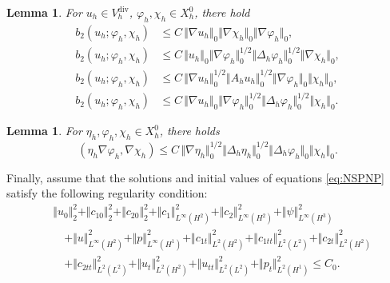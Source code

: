 \documentclass[a4paper,fleqn]{cas-sc}
\numberwithin{equation}{section}
\newtheorem{lemma}[theorem]{Lemma}
\theoremstyle{definition}
\begin{document}
\begin{lemma}
  \label{lem:3}
  For $u_{h}\in V_{h}^{\mathrm{div}}$, $\varphi_{h},\chi_{h}\in X^{0}_{h}$,
  there hold
  \begin{align}
    b_{2}(u_{h};\varphi_{h},\chi_{h})
    &\le C\,\Vert\nabla u_{h}\Vert_{0}
            \Vert\nabla\chi_{h}\Vert_{0}
            \Vert\nabla\varphi_{h}\Vert_{0},
    \label{eq:2.32}\\
    b_{2}(u_{h};\varphi_{h},\chi_{h})
    &\le C\,\Vert u_{h}\Vert_{0}
            \Vert\nabla\varphi_{h}\Vert_{0}^{1/2}
            \Vert\Delta_{h}\varphi_{h}\Vert_{0}^{1/2}
            \Vert\nabla\chi_{h}\Vert_{0},
    \label{eq:2.33}\\
    b_{2}(u_{h};\varphi_{h},\chi_{h})
    &\le C\,\Vert\nabla u_{h}\Vert_{0}^{1/2}
            \Vert A_{h}u_{h}\Vert_{0}^{1/2}
            \Vert\nabla\varphi_{h}\Vert_{0}
            \Vert\chi_{h}\Vert_{0},
    \label{eq:2.34}\\
    b_{2}(u_{h};\varphi_{h},\chi_{h})
    &\le C\,\Vert\nabla u_{h}\Vert_{0}
            \Vert\nabla\varphi_{h}\Vert_{0}^{1/2}
            \Vert\Delta_{h}\varphi_{h}\Vert_{0}^{1/2}
            \Vert\chi_{h}\Vert_{0}.
    \label{eq:2.35}
  \end{align}
\end{lemma}

\begin{lemma}
  \label{lem:4}
  For $\eta_{h},\varphi_{h},\chi_{h}\in X^{0}_{h}$, there holds
  \begin{equation}
    (\eta_{h}\nabla\varphi_{h},\nabla\chi_{h})
    \le C\,\Vert\nabla\eta_{h}\Vert_{0}^{1/2}
           \Vert\Delta_{h}\eta_{h}\Vert_{0}^{1/2}
           \Vert\Delta_{h}\varphi_{h}\Vert_{0}
           \Vert\chi_{h}\Vert_{0}.
    \label{eq:2.36}
  \end{equation}
\end{lemma}

Finally, assume that the solutions and initial values of equations
\eqref{eq:NSPNP} satisfy the following regularity condition:
\begin{equation}
  \begin{aligned}
    &\Vert u_{0}\Vert_{2}^{2}
     + \Vert c_{10}\Vert_{2}^{2}
     + \Vert c_{20}\Vert_{2}^{2}
     + \Vert c_{1}\Vert_{L^{\infty}(H^{2})}^{2}
     + \Vert c_{2}\Vert_{L^{\infty}(H^{2})}^{2}
     + \Vert\psi\Vert_{L^{\infty}(H^{3})}^{2}\\
    &\quad
     + \Vert u\Vert_{L^{\infty}(H^{2})}^{2}
     + \Vert p\Vert_{L^{\infty}(H^{1})}^{2}
     + \Vert c_{1t}\Vert_{L^{2}(H^{2})}^{2}
     + \Vert c_{1tt}\Vert_{L^{2}(L^{2})}^{2}
     + \Vert c_{2t}\Vert_{L^{2}(H^{2})}^{2}\\
    &\quad
     + \Vert c_{2tt}\Vert_{L^{2}(L^{2})}^{2}
     + \Vert u_{t}\Vert_{L^{2}(H^{2})}^{2}
     + \Vert u_{tt}\Vert_{L^{2}(L^{2})}^{2}
     + \Vert p_{t}\Vert_{L^{2}(H^{1})}^{2}
    \le C_{0}.
  \end{aligned}
  \label{eq:2.37}
\end{equation}
\end{document}
